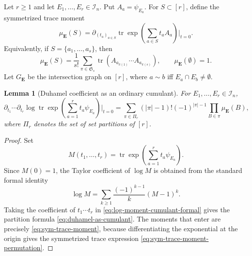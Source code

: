 \documentclass[11pt]{article}
\newtheorem{lemma}[theorem]{Lemma}
\newcommand{\tr}{\operatorname{tr}}
\newcommand{\calI}{\mathcal{I}}
\begin{document}
Let $r\geq1$ and let $E_1,\ldots,E_r\in\calI_n$.  Put
$A_a=\psi_{E_a}$.  For $S\subset[r]$, define the symmetrized trace moment
\begin{equation}\label{eq:sym-trace-moment}
  \mu_{\mathbf E}(S)
  =
  \partial_{(t_a)_{a\in S}}
  \tr\exp\left(\sum_{a\in S}t_aA_a\right)\bigg|_{t=0}.
\end{equation}
Equivalently, if $S=\{a_1,\ldots,a_s\}$, then
\begin{equation}\label{eq:sym-trace-moment-permutation}
  \mu_{\mathbf E}(S)
  =
  \frac1{s!}
  \sum_{\pi\in\mathfrak S_s}
  \tr\left(A_{a_{\pi(1)}}\cdots A_{a_{\pi(s)}}\right),
  \qquad
  \mu_{\mathbf E}(\emptyset)=1.
\end{equation}
Let $G_{\mathbf E}$ be the intersection graph on $[r]$, where $a\sim b$ iff
$E_a\cap E_b\neq\emptyset$.

\begin{lemma}[Duhamel coefficient as an ordinary cumulant]
  \label{lem:duhamel-as-cumulant}
  For $E_1,\ldots,E_r\in\calI_n$,
  \begin{equation}\label{eq:duhamel-as-cumulant}
    \partial_{t_1}\cdots\partial_{t_r}
    \log\tr\exp\left(\sum_{a=1}^r t_a\psi_{E_a}\right)\bigg|_{t=0}
    =
    \sum_{\pi\in\Pi_r}
    (|\pi|-1)!(-1)^{|\pi|-1}
    \prod_{B\in\pi}\mu_{\mathbf E}(B),
  \end{equation}
  where $\Pi_r$ denotes the set of set partitions of $[r]$.
\end{lemma}

\begin{proof}
  Set
  \begin{equation}\label{eq:moment-generating-function}
    M(t_1,\ldots,t_r)
    =
    \tr\exp\left(\sum_{a=1}^r t_a\psi_{E_a}\right).
  \end{equation}
  Since $M(0)=1$, the Taylor coefficient of $\log M$ is obtained from the
  standard formal identity
  \begin{equation}\label{eq:log-moment-cumulant-formal}
    \log M
    =
    \sum_{k\geq1}\frac{(-1)^{k-1}}{k}(M-1)^k.
  \end{equation}
  Taking the coefficient of $t_1\cdots t_r$ in
  \eqref{eq:log-moment-cumulant-formal} gives the partition formula
  \eqref{eq:duhamel-as-cumulant}.  The moments that enter are precisely
  \eqref{eq:sym-trace-moment}, because differentiating the exponential at the
  origin gives the symmetrized trace expression
  \eqref{eq:sym-trace-moment-permutation}.
\end{proof}
\end{document}
